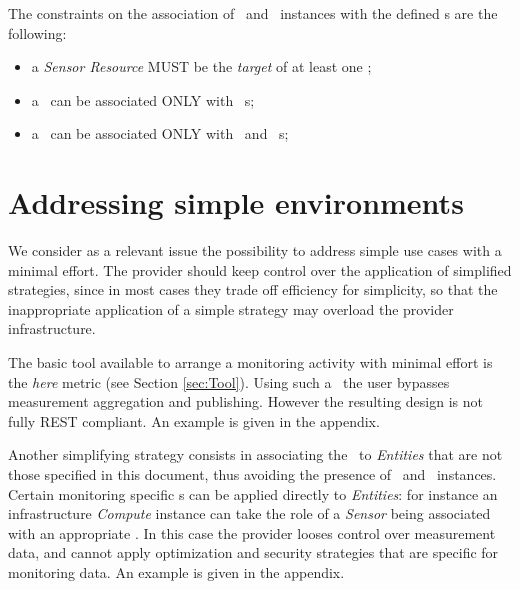 \documentclass[10pt]{article}  %
\begin{document}
The constraints on the association of \sens\ and \coll\ instances with the defined \mi s are the following:

\begin{itemize}

\item a {\em Sensor Resource} MUST be the {\em target} of at least one \coll ;

\item a \coll\ can be associated ONLY with \metr\ \mi s;

\item a \sens\ can be associated ONLY with \publ\ and \aggr\ \mi s;

\end{itemize}


\section{Addressing simple environments \label{simple}}

We consider as a relevant issue the possibility to address simple use cases with a minimal effort. The provider should keep control over the application of simplified strategies, since in most cases they trade off efficiency for simplicity, so that the inappropriate application of a simple strategy may overload the provider infrastructure.

The basic tool available to arrange a monitoring activity with minimal effort is the {\em here} metric \mi (see Section \ref{sec:Tool}). Using such a \mi\ the user bypasses measurement aggregation and publishing. However the resulting design is not fully REST compliant. An example is given in the appendix.

Another simplifying strategy consists in associating the \mi\ to {\em Entities} that are not those specified in this document, thus avoiding the presence of \sens\ and \coll\ instances. Certain monitoring specific \mi s can be applied directly to {\em Entities}: for instance an infrastructure {\em Compute} instance can take the role of a {\em Sensor} being associated with an appropriate \mi . In this case the provider looses control over measurement data, and cannot apply optimization and security strategies that are specific for monitoring data. An example is given in the appendix.
\end{document}
